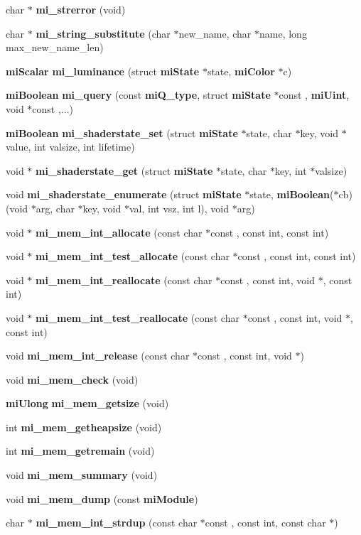 \begin{CompactItemize}
\item 
char $\ast$ {\bf mi\_\-strerror} (void)
\item 
char $\ast$ {\bf mi\_\-string\_\-substitute} (char $\ast$new\_\-name, char $\ast$name, long max\_\-new\_\-name\_\-len)
\item 
{\bf mi\-Scalar} {\bf mi\_\-luminance} (struct {\bf mi\-State} $\ast$state, {\bf mi\-Color} $\ast$c)
\item 
{\bf mi\-Boolean} {\bf mi\_\-query} (const {\bf mi\-Q\_\-type}, struct {\bf mi\-State} $\ast$const , {\bf mi\-Uint}, void $\ast$const ,...)
\item 
{\bf mi\-Boolean} {\bf mi\_\-shaderstate\_\-set} (struct {\bf mi\-State} $\ast$state, char $\ast$key, void $\ast$value, int valsize, int lifetime)
\item 
void $\ast$ {\bf mi\_\-shaderstate\_\-get} (struct {\bf mi\-State} $\ast$state, char $\ast$key, int $\ast$valsize)
\item 
void {\bf mi\_\-shaderstate\_\-enumerate} (struct {\bf mi\-State} $\ast$state, {\bf mi\-Boolean}($\ast$cb)(void $\ast$arg, char $\ast$key, void $\ast$val, int vsz, int l), void $\ast$arg)
\item 
void $\ast$ {\bf mi\_\-mem\_\-int\_\-allocate} (const char $\ast$const , const int, const int)
\item 
void $\ast$ {\bf mi\_\-mem\_\-int\_\-test\_\-allocate} (const char $\ast$const , const int, const int)
\item 
void $\ast$ {\bf mi\_\-mem\_\-int\_\-reallocate} (const char $\ast$const , const int, void $\ast$, const int)
\item 
void $\ast$ {\bf mi\_\-mem\_\-int\_\-test\_\-reallocate} (const char $\ast$const , const int, void $\ast$, const int)
\item 
void {\bf mi\_\-mem\_\-int\_\-release} (const char $\ast$const , const int, void $\ast$)
\item 
void {\bf mi\_\-mem\_\-check} (void)
\item 
{\bf mi\-Ulong} {\bf mi\_\-mem\_\-getsize} (void)
\item 
int {\bf mi\_\-mem\_\-getheapsize} (void)
\item 
int {\bf mi\_\-mem\_\-getremain} (void)
\item 
void {\bf mi\_\-mem\_\-summary} (void)
\item 
void {\bf mi\_\-mem\_\-dump} (const {\bf mi\-Module})
\item 
char $\ast$ {\bf mi\_\-mem\_\-int\_\-strdup} (const char $\ast$const , const int, const char $\ast$)

\end{CompactItemize}
